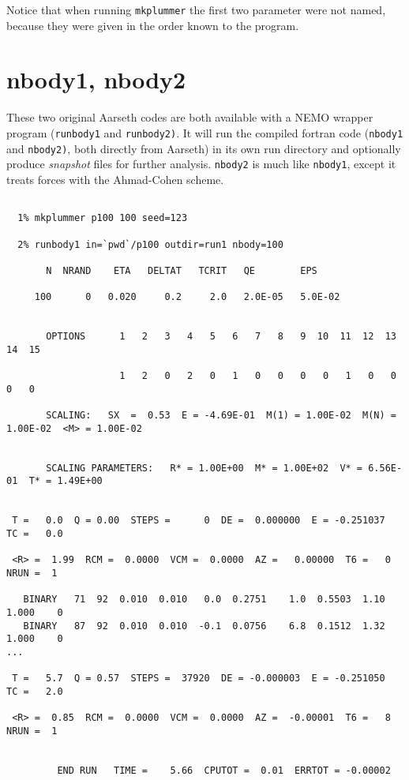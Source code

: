 Notice that when running {\tt mkplummer} the first two parameter
were not named, because they were given in the order known to the program.


\section{nbody1, nbody2}

These two original Aarseth codes are both available with a NEMO wrapper program
({\tt runbody1} and {\tt runbody2)}. It will run the compiled fortran 
code ({\tt nbody1} and {\tt nbody2)}, both directly from Aarseth)
in its own run directory and 
optionally produce {\it snapshot} files for further
analysis. {\tt nbody2}  is much like {\tt nbody1}, except it
treats forces with the Ahmad-Cohen scheme.

\footnotesize\begin{verbatim}

  1% mkplummer p100 100 seed=123

  2% runbody1 in=`pwd`/p100 outdir=run1 nbody=100

       N  NRAND    ETA   DELTAT   TCRIT   QE        EPS

     100      0   0.020     0.2     2.0   2.0E-05   5.0E-02
 
 
       OPTIONS      1   2   3   4   5   6   7   8   9  10  11  12  13  14  15

                    1   2   0   2   0   1   0   0   0   0   1   0   0   0   0
 
       SCALING:   SX  =  0.53  E = -4.69E-01  M(1) = 1.00E-02  M(N) = 1.00E-02  <M> = 1.00E-02
 

       SCALING PARAMETERS:   R* = 1.00E+00  M* = 1.00E+02  V* = 6.56E-01  T* = 1.49E+00
 
 
 T =   0.0  Q = 0.00  STEPS =      0  DE =  0.000000  E = -0.251037  TC =   0.0
 
 <R> =  1.99  RCM =  0.0000  VCM =  0.0000  AZ =   0.00000  T6 =   0  NRUN =  1
 
   BINARY   71  92  0.010  0.010   0.0  0.2751    1.0  0.5503  1.10  1.000    0
   BINARY   87  92  0.010  0.010  -0.1  0.0756    6.8  0.1512  1.32  1.000    0
...
 
 T =   5.7  Q = 0.57  STEPS =  37920  DE = -0.000003  E = -0.251050  TC =   2.0
 
 <R> =  0.85  RCM =  0.0000  VCM =  0.0000  AZ =  -0.00001  T6 =   8  NRUN =  1
 
 
         END RUN   TIME =    5.66  CPUTOT =  0.01  ERRTOT = -0.00002

\end{verbatim}\normalsize

